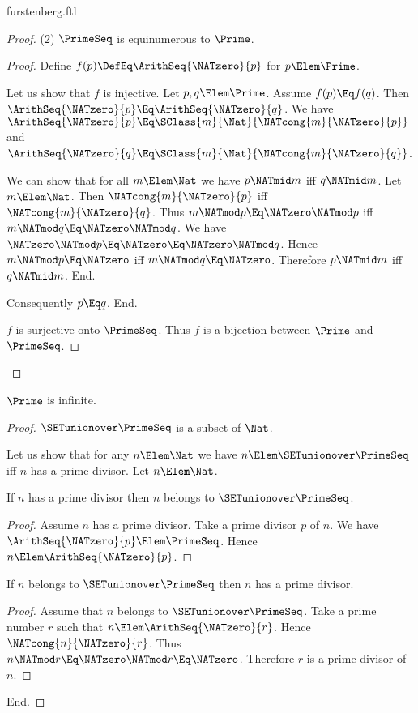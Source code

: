 \documentclass{stex}
\begin{document}
\begin{smodule}{furstenberg.ftl}
\begin{forthel}
\begin{proof}
    (2) $\PrimeSeq$ is equinumerous to $\Prime$.
    \begin{proof}
      Define $f(p) \DefEq \ArithSeq{\NATzero}{p}$ for $p \Elem \Prime$.

      Let us show that $f$ is injective.
        Let $p, q \Elem \Prime$.
        Assume $f(p) \Eq f(q)$.
        Then $\ArithSeq{\NATzero}{p} \Eq \ArithSeq{\NATzero}{q}$.
        We have $\ArithSeq{\NATzero}{p} \Eq \SClass{m}{\Nat}{\NATcong{m}{\NATzero}{p}}$ and
        $\ArithSeq{\NATzero}{q} \Eq\linebreak \SClass{m}{\Nat}{\NATcong{m}{\NATzero}{q}}$.

        We can show that for all $m \Elem \Nat$ we have $p \NATmid m$ iff $q \NATmid m$.
          Let $m \Elem \Nat$.
          Then $\NATcong{m}{\NATzero}{p}$ iff $\NATcong{m}{\NATzero}{q}$.
          Thus $m \NATmod p \Eq \NATzero \NATmod p$ iff $m \NATmod q \Eq\linebreak \NATzero \NATmod q$.
          We have $\NATzero \NATmod p \Eq \NATzero \Eq \NATzero \NATmod q$.
          Hence $m \NATmod p \Eq \NATzero$ iff $m \NATmod q \Eq\linebreak \NATzero$.
          Therefore $p \NATmid m$ iff $q \NATmid m$.
        End.

        Consequently $p \Eq q$.
      End.

      $f$ is surjective onto $\PrimeSeq$.
      Thus $f$ is a bijection between $\Prime$ and $\PrimeSeq$.
    \end{proof}
  \end{proof}

  \begin{theorem}[title=Furstenberg,name=Furstenberg]
    $\Prime$ is infinite.
  \end{theorem}
  \begin{proof}
    $\SETunionover \PrimeSeq$ is a subset of $\Nat$.

    Let us show that for any $n \Elem \Nat$ we have $n \Elem \SETunionover \PrimeSeq$ iff $n$
    has a prime divisor.
      Let $n \Elem \Nat$.

      If $n$ has a prime divisor then $n$ belongs to $\SETunionover \PrimeSeq$.
      \begin{proof}
        Assume $n$ has a prime divisor.
        Take a prime divisor $p$ of $n$.
        We have $\ArithSeq{\NATzero}{p} \Elem \PrimeSeq$.
        Hence $n \Elem \ArithSeq{\NATzero}{p}$.
      \end{proof}

      If $n$ belongs to $\SETunionover \PrimeSeq$ then $n$ has a prime divisor.
      \begin{proof}
        Assume that $n$ belongs to $\SETunionover \PrimeSeq$.
        Take a prime number $r$ such that $n \Elem \ArithSeq{\NATzero}{r}$.
        Hence $\NATcong{n}{\NATzero}{r}$.
        Thus $n \NATmod r \Eq \NATzero \NATmod r \Eq \NATzero$.
        Therefore $r$ is a prime divisor of $n$.
      \end{proof}
    End.


\end{proof}
\end{forthel}
\end{smodule}
\end{document}
